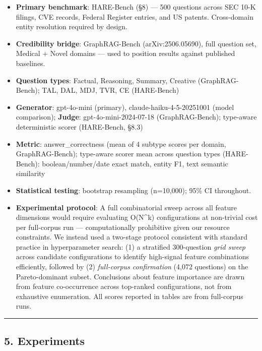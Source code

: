 \documentclass[
]{article}
\providecommand{\tightlist}{%
  \setlength{\itemsep}{0pt}\setlength{\parskip}{0pt}}
\begin{document}
\begin{itemize}
\tightlist
\item
  \textbf{Primary benchmark}: HARE-Bench (§8) --- 500 questions across
  SEC 10-K filings, CVE records, Federal Register entries, and US
  patents. Cross-domain entity resolution required by design.
\item
  \textbf{Credibility bridge}: GraphRAG-Bench (arXiv:2506.05690), full
  question set, Medical + Novel domains --- used to position results
  against published baselines.
\item
  \textbf{Question types}: Factual, Reasoning, Summary, Creative
  (GraphRAG-Bench); TAL, DAL, MDJ, TVR, CE (HARE-Bench)
\item
  \textbf{Generator}: gpt-4o-mini (primary), claude-haiku-4-5-20251001
  (model comparison); \textbf{Judge}: gpt-4o-mini-2024-07-18
  (GraphRAG-Bench); type-aware deterministic scorer (HARE-Bench, §8.3)
\item
  \textbf{Metric}: answer\_correctness (mean of 4 subtype scores per
  domain, GraphRAG-Bench); type-aware scorer mean across question types
  (HARE-Bench): boolean/number/date exact match, entity F1, text
  semantic similarity
\item
  \textbf{Statistical testing}: bootstrap resampling (n=10,000); 95\% CI
  throughout.
\item
  \textbf{Experimental protocol}: A full combinatorial sweep across all
  feature dimensions would require evaluating O(N\^{}k) configurations
  at non-trivial cost per full-corpus run --- computationally
  prohibitive given our resource constraints. We instead used a
  two-stage protocol consistent with standard practice in hyperparameter
  search: (1) a stratified 300-question \emph{grid sweep} across
  candidate configurations to identify high-signal feature combinations
  efficiently, followed by (2) \emph{full-corpus confirmation} (4,072
  questions) on the Pareto-dominant subset. Conclusions about feature
  importance are drawn from feature co-occurrence across top-ranked
  configurations, not from exhaustive enumeration. All scores reported
  in tables are from full-corpus runs.
\end{itemize}

\begin{center}\rule{0.5\linewidth}{0.5pt}\end{center}

\subsection{5. Experiments}\label{experiments}
\end{document}
